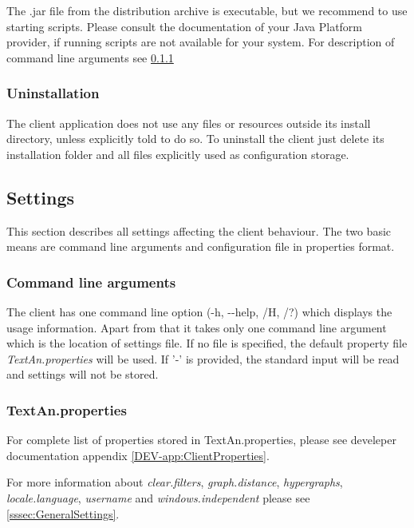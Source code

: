 The .jar file from the distribution archive is executable,
but we recommend to use starting scripts.
Please consult the documentation of your Java Platform provider,
if running scripts are not available for your system.
For description of command line arguments see \ref{ssec:CliCmdArg}

\subsubsection{Uninstallation}

The client application does not use any files or resources outside its install
directory, unless explicitly told to do so.
To uninstall the client just delete its installation folder and all files
explicitly used as configuration storage.

\subsection{Settings}

This section describes all settings affecting the client behaviour.
The two basic means are command line arguments and configuration file in
properties format.

\subsubsection{Command line arguments}
\label{ssec:CliCmdArg}

The client has one command line option (-h, -{}-help, /H, /?) which displays the
usage information. Apart from that it takes only one command line argument
which is the location of settings file. If no file is specified, the default
property file \emph{TextAn.properties} will be used. If '-' is provided, the
standard input will be read and settings will not be stored.

\subsubsection{TextAn.properties}

For complete list of properties stored in TextAn.properties, please see develeper documentation appendix \ref{DEV-app:ClientProperties}.

For more information about \emph{clear.filters}, \emph{graph.distance},
\emph{hypergraphs}, \emph{locale.language}, \emph{username}
and \emph{windows.independent} please see \ref{sssec:GeneralSettings}.
